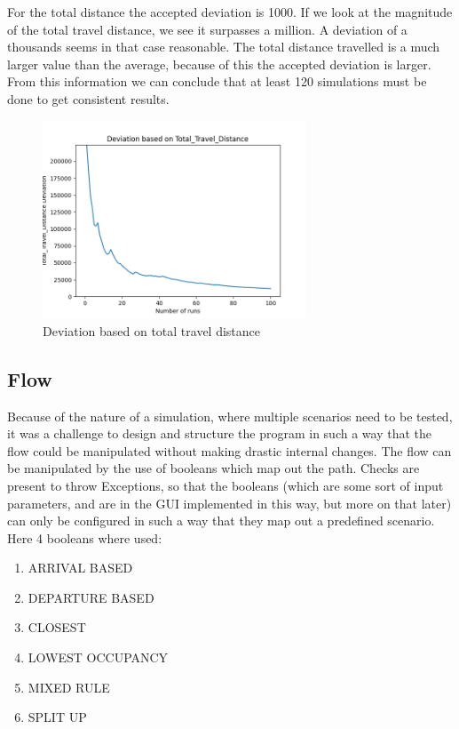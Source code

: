 \documentclass{article}
\begin{document}
For the total distance the accepted deviation is 1000. If we look at the
magnitude of the total travel distance, we see it surpasses a million. A
deviation of a thousands seems in that case reasonable. The total distance
travelled is a much larger value than the average, because of this the accepted
deviation is larger. From this information we can conclude that at least 120
simulations must be done to get consistent results.

\begin{figure}[h]
    \centering
    \includegraphics[width=0.7\textwidth]{fig/calcruns.png}
    \caption{Deviation based on total travel distance}\label{fig:amount_of_runs}
\end{figure}

\subsection{Flow}
Because of the nature of a simulation, where multiple scenarios need to be
tested, it was a challenge to design and structure the program in such a way
that the flow could be manipulated without making drastic internal changes. The
flow can be manipulated by the use of booleans which map out the path. Checks
are present to throw Exceptions, so that the booleans (which are some sort of
input parameters, and are in the GUI implemented in this way, but more on that
later) can only be configured in such a way that they map out a predefined
scenario. Here 4 booleans where used:
\begin{enumerate}
    \item ARRIVAL BASED
    \item DEPARTURE BASED
    \item CLOSEST
    \item LOWEST OCCUPANCY
    \item MIXED RULE
    \item SPLIT UP
\end{enumerate}
\end{document}
